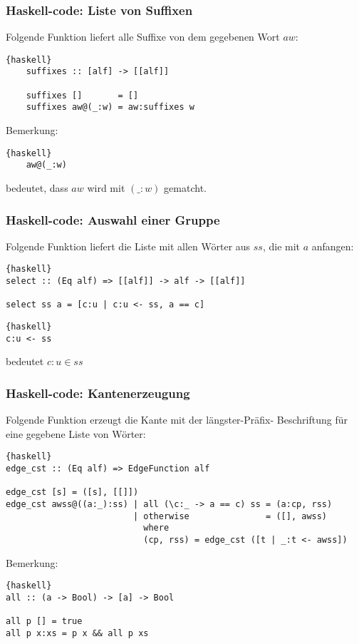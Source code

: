 \documentclass{beamer}
\begin{document}
\begin{frame}[fragile]
\frametitle{Haskell-code: Liste von Suffixen}
    Folgende Funktion liefert alle Suffixe von dem gegebenen Wort $aw$:
    \begin{lstlisting}{haskell}
    suffixes :: [alf] -> [[alf]]

    suffixes []       = []              
    suffixes aw@(_:w) = aw:suffixes w 
    \end{lstlisting}
    \bigskip
    Bemerkung: \begin{lstlisting}{haskell}
    aw@(_:w)
    \end{lstlisting} bedeutet, dass $aw$ wird mit $(\_:w)$ gematcht.
\end{frame}

\begin{frame}[fragile]
\frametitle{Haskell-code: Auswahl einer Gruppe}
    Folgende Funktion liefert die Liste mit allen Wörter aus $ss$, die mit $a$ anfangen:
\begin{lstlisting}{haskell}
select :: (Eq alf) => [[alf]] -> alf -> [[alf]]

select ss a = [c:u | c:u <- ss, a == c]
\end{lstlisting}
\bigskip
\begin{remark}
\begin{lstlisting}{haskell}
c:u <- ss
\end{lstlisting} bedeutet $c:u \in ss$
\end{remark}
\end{frame}

\begin{frame}[fragile]
\frametitle{Haskell-code: Kantenerzeugung}
Folgende Funktion erzeugt die Kante mit der längster-Präfix- Beschriftung für eine gegebene Liste von Wörter:
\begin{lstlisting}{haskell}
edge_cst :: (Eq alf) => EdgeFunction alf

edge_cst [s] = ([s], [[]])
edge_cst awss@((a:_):ss) | all (\c:_ -> a == c) ss = (a:cp, rss)
                         | otherwise               = ([], awss)
                           where 
                           (cp, rss) = edge_cst ([t | _:t <- awss])
\end{lstlisting}
\bigskip
Bemerkung:
\begin{lstlisting}{haskell}
all :: (a -> Bool) -> [a] -> Bool

all p [] = true
all p x:xs = p x && all p xs
\end{lstlisting} 
\end{frame}
\end{document}
